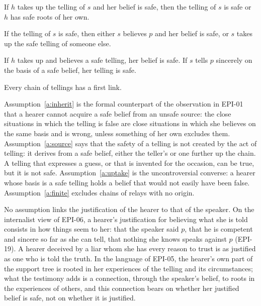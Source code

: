 \documentclass{situationist-preprint}
\begin{document}
\begin{assumption}[Inheritance]\label{a:inherit}
If $h$ takes up the telling of $s$ and her belief is safe, then the telling of $s$ is safe or $h$ has safe roots of her own.
\end{assumption}

\begin{assumption}\label{a:source}
If the telling of $s$ is safe, then either $s$ believes $p$ and her belief is safe, or $s$ takes up the safe telling of someone else.
\end{assumption}

\begin{assumption}\label{a:uptake}
If $h$ takes up and believes a safe telling, her belief is safe. If $s$ tells $p$ sincerely on the basis of a safe belief, her telling is safe.
\end{assumption}

\begin{assumption}\label{a:finite}
Every chain of tellings has a first link.
\end{assumption}

Assumption~\ref{a:inherit} is the formal counterpart of the observation in EPI-01 that a hearer cannot acquire a safe belief from an unsafe source: the close situations in which the telling is false are close situations in which she believes on the same basis and is wrong, unless something of her own excludes them. Assumption~\ref{a:source} says that the safety of a telling is not created by the act of telling: it derives from a safe belief, either the teller's or one further up the chain. A telling that expresses a guess, or that is invented for the occasion, can be true, but it is not safe. Assumption~\ref{a:uptake} is the uncontroversial converse: a hearer whose basis is a safe telling holds a belief that would not easily have been false. Assumption~\ref{a:finite} excludes chains of relays with no origin.

No assumption links the justification of the hearer to that of the speaker. On the internalist view of EPI-06, a hearer's justification for believing what she is told consists in how things seem to her: that the speaker said $p$, that he is competent and sincere so far as she can tell, that nothing she knows speaks against $p$ (EPI-19). A hearer deceived by a liar whom she has every reason to trust is as justified as one who is told the truth. In the language of EPI-05, the hearer's own part of the support tree is rooted in her experiences of the telling and its circumstances; what the testimony adds is a connection, through the speaker's belief, to roots in the experiences of others, and this connection bears on whether her justified belief is safe, not on whether it is justified.
\end{document}
